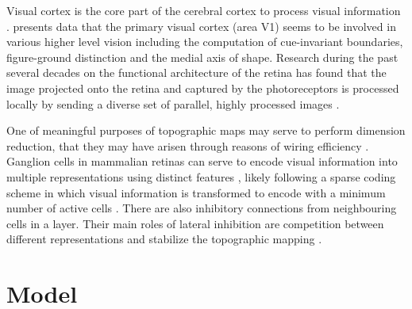 \documentclass[letterpaper, 10 pt, conference]{ieeeconf}  %
\begin{document}
Visual cortex is the core part of the cerebral cortex to process visual information \cite{katzner2009local}.
\cite{lee1998role} presents data that the primary visual cortex (area V1) seems to be involved in various higher level vision including the computation of cue-invariant boundaries, figure-ground distinction and the medial axis of shape.
Research during the past several decades on the functional architecture of the retina has found that the image projected onto the retina and captured by the photoreceptors is processed locally by sending a diverse set of parallel, highly processed images \cite{roska2014retina, Sanes2015}.

One of meaningful purposes of topographic maps may serve to perform dimension reduction, that they may have arisen through reasons of wiring efficiency \cite{bamford2010synaptic}.
Ganglion cells in mammalian retinas can serve to encode visual information into multiple representations using distinct features \cite{roska2014retina}, likely following a sparse coding scheme in which visual information is transformed to encode with a minimum number of active cells \cite{Field1994}.
There are also inhibitory connections from neighbouring cells in a layer. 
Their main roles of lateral inhibition are competition between different representations and stabilize the topographic mapping \cite{Kisvarday1994,mauss2015neural}.

\section{Model}
\end{document}
